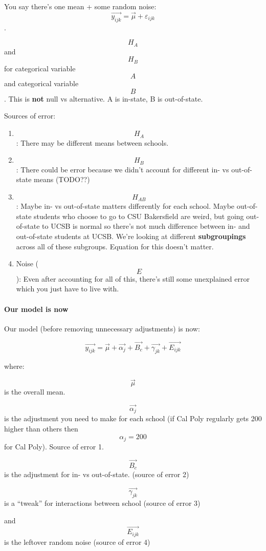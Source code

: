 You say there's one mean + some random noise:
\[ \vec{y_{ijk}} = \vec{\mu} + \varepsilon_{ijk} \].

\[H_A\] and \[H_B\] for categorical variable \[A\] and categorical
variable \[B\]. This is \textbf{not} null vs alternative. A is in-state,
B is out-of-state.

Sources of error:

\begin{enumerate}
\def\labelenumi{\arabic{enumi}.}
\tightlist
\item
  \[H_A\]: There may be different means between schools.
\item
  \[H_B\]: There could be error because we didn't account for different
  in- vs out-of-state means (TODO??)
\item
  \[H_{AB}\]: Maybe in- vs out-of-state matters differently for each
  school. Maybe out-of-state students who choose to go to CSU
  Bakersfield are weird, but going out-of-state to UCSB is normal so
  there's not much difference between in- and out-of-state students at
  UCSB. We're looking at different \textbf{subgroupings} across all of
  these subgroups. Equation for this doesn't matter.
\item
  Noise (\[E\]): Even after accounting for all of this, there's still
  some unexplained error which you just have to live with.
\end{enumerate}

\hypertarget{our-model-is-now}{%
\paragraph{Our model is now}\label{our-model-is-now}}

Our model (before removing unnecessary adjustments) is now:

\[\vec{y_{ijk}} = \vec{\mu} + \vec{\alpha_j} + \vec{B_c} + \vec{\gamma_{jk}} + \vec{E_{ijk}}\]

where:

\[\vec{\mu}\] is the overall mean.

\[\vec{\alpha_j}\] is the adjustment you need to make for each school
(if Cal Poly regularly gets 200 higher than others then
\[\alpha_j = 200\] for Cal Poly). Source of error 1.

\[\vec{B_c}\] is the adjustment for in- vs out-of-state. (source of
error 2)

\[\vec{\gamma_{jk}}\] is a ``tweak'' for interactions between school
(source of error 3)

and \[\vec{E_{ijk}}\] is the leftover random noise (source of error 4)

